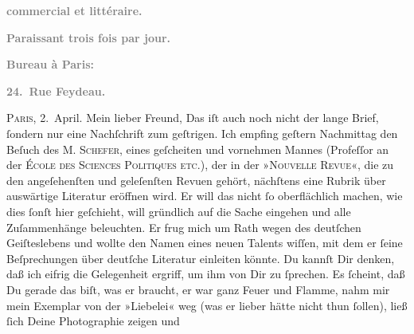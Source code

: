 \begin{ledgroupsized}[t]{13cm}
           \pstart
           \begin{otherlanguage}{french}\textcolor{gray}{\textbf{commercial et littéraire.}}\end{otherlanguage}\pend
           \pstart
           \begin{otherlanguage}{french}\textcolor{gray}{\textbf{\textbf{Paraissant trois fois par jour.}}}\end{otherlanguage}\pend
           \pstart
           \begin{otherlanguage}{french}\textcolor{gray}{\textbf{\textbf{Bureau à Paris:}}}\end{otherlanguage}\pend
           \pstart
           \begin{otherlanguage}{french}\textcolor{gray}{\textbf{\textbf{24. Rue Feydeau.}}}\end{otherlanguage}\hfill \textsc{Paris}, 2. April.\pend
           \pstart\center{}Mein lieber Freund,\pend\pstart
           Das iſt auch noch nicht der lange Brief, ſondern nur eine Nachſchrift zum geſtrigen.
               Ich empfing geſtern{ }Nachmittag den Beſuch des \textsc{M. Schefer}, eines geſcheiten und vornehmen Mannes (Profeſſor an der \textsc{École des Sciences Politiques etc.}), der
               in der »\textsc{Nouvelle Revue}«, die zu den angeſehenſten und geleſenſten Revuen gehört, nächſtens eine Rubrik
               über auswärtige Literatur eröffnen wird. Er will das nicht ſo oberflächlich machen,
               wie dies ſonſt hier geſchieht, will gründlich auf die Sache {\pb}eingehen und alle Zuſammenhänge beleuchten. Er frug
               mich um Rath wegen des deutſchen Geiſteslebens und wollte den Namen eines neuen
               Talents wiſſen, mit dem er ſeine Beſprechungen über deutſche Literatur einleiten
               könnte. Du kannſt Dir denken, daß ich eifrig die Gelegenheit ergriff, um ihm von Dir
               zu ſprechen. Es ſcheint, daß Du gerade das biſt, was er braucht, er war ganz Feuer
               und Flamme, nahm mir mein Exemplar von der »Liebelei« weg (was er lieber hätte nicht thun {\pb}ſollen), ließ ſich Deine Photographie zeigen und

\end{ledgroupsized}
